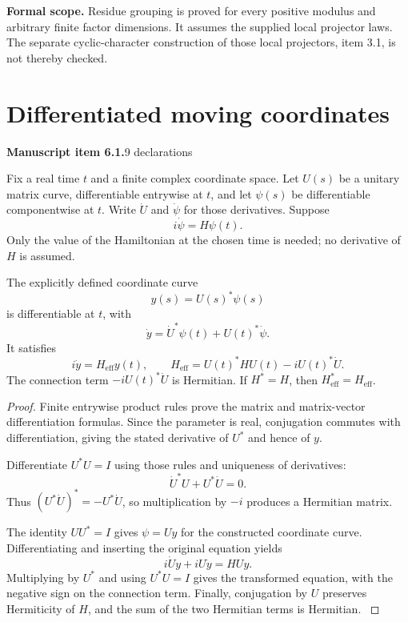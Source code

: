 \textbf{Formal scope.} Residue grouping is proved for every positive modulus and arbitrary finite factor dimensions. It assumes the supplied local projector laws. The separate cyclic-character construction of those local projectors, item 3.1, is not thereby checked.





\section{Differentiated moving coordinates}\label{supp2:section:003}
\textbf{Manuscript item 6.1.}\quad {}\hfill 9 declarations

Fix a real time $t$ and a finite complex coordinate space. Let $U(s)$ be a unitary matrix curve, differentiable entrywise at $t$, and let $\psi(s)$ be differentiable componentwise at $t$. Write $\dot U$ and $\dot\psi$ for those derivatives. Suppose
\[
 i\dot\psi=H\psi(t).
\]
Only the value of the Hamiltonian at the chosen time is needed; no derivative of $H$ is assumed.

\begin{statement}\label{supp2:statement:003}
The explicitly defined coordinate curve
\[
 y(s)=U(s)^*\psi(s)
\]
is differentiable at $t$, with
\[
 \dot y=\dot U^*\psi(t)+U(t)^*\dot\psi.
\]
It satisfies
\[
 \boxed{\quad i\dot y=H_{\mathrm{eff}}y(t),\qquad
 H_{\mathrm{eff}}=U(t)^*HU(t)-iU(t)^*\dot U.\quad}
\]
The connection term $-iU(t)^*\dot U$ is Hermitian. If $H^*=H$, then $H_{\mathrm{eff}}^*=H_{\mathrm{eff}}$.
\end{statement}

\begin{proof}\label{supp2:proof:003}
Finite entrywise product rules prove the matrix and matrix-vector differentiation formulas. Since the parameter is real, conjugation commutes with differentiation, giving the stated derivative of $U^*$ and hence of $y$.

Differentiate $U^*U=I$ using those rules and uniqueness of derivatives:
\[
 \dot U^*U+U^*\dot U=0.
\]
Thus $(U^*\dot U)^*=-U^*\dot U$, so multiplication by $-i$ produces a Hermitian matrix.

The identity $UU^*=I$ gives $\psi=Uy$ for the constructed coordinate curve. Differentiating and inserting the original equation yields
\[
 i\dot U y+iU\dot y=HUy.
\]
Multiplying by $U^*$ and using $U^*U=I$ gives the transformed equation, with the negative sign on the connection term. Finally, conjugation by $U$ preserves Hermiticity of $H$, and the sum of the two Hermitian terms is Hermitian.
\label{supp2:proof:003:end}\end{proof}

